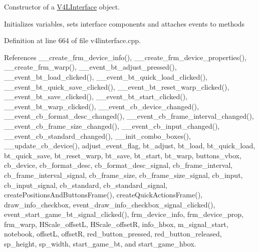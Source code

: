 Constructor of a \hyperlink{class_v_s_s_s___g_u_i_1_1_v4_l_interface}{V4\+L\+Interface} object. 

Initializes variables, sets interface components and attaches events to methods 

Definition at line 664 of file v4linterface.\+cpp.



References \+\_\+\+\_\+create\+\_\+frm\+\_\+device\+\_\+info(), \+\_\+\+\_\+create\+\_\+frm\+\_\+device\+\_\+properties(), \+\_\+\+\_\+create\+\_\+frm\+\_\+warp(), \+\_\+\+\_\+event\+\_\+bt\+\_\+adjust\+\_\+pressed(), \+\_\+\+\_\+event\+\_\+bt\+\_\+load\+\_\+clicked(), \+\_\+\+\_\+event\+\_\+bt\+\_\+quick\+\_\+load\+\_\+clicked(), \+\_\+\+\_\+event\+\_\+bt\+\_\+quick\+\_\+save\+\_\+clicked(), \+\_\+\+\_\+event\+\_\+bt\+\_\+reset\+\_\+warp\+\_\+clicked(), \+\_\+\+\_\+event\+\_\+bt\+\_\+save\+\_\+clicked(), \+\_\+\+\_\+event\+\_\+bt\+\_\+start\+\_\+clicked(), \+\_\+\+\_\+event\+\_\+bt\+\_\+warp\+\_\+clicked(), \+\_\+\+\_\+event\+\_\+cb\+\_\+device\+\_\+changed(), \+\_\+\+\_\+event\+\_\+cb\+\_\+format\+\_\+desc\+\_\+changed(), \+\_\+\+\_\+event\+\_\+cb\+\_\+frame\+\_\+interval\+\_\+changed(), \+\_\+\+\_\+event\+\_\+cb\+\_\+frame\+\_\+size\+\_\+changed(), \+\_\+\+\_\+event\+\_\+cb\+\_\+input\+\_\+changed(), \+\_\+\+\_\+event\+\_\+cb\+\_\+standard\+\_\+changed(), \+\_\+\+\_\+init\+\_\+combo\+\_\+boxes(), \+\_\+\+\_\+update\+\_\+cb\+\_\+device(), adjust\+\_\+event\+\_\+flag, bt\+\_\+adjust, bt\+\_\+load, bt\+\_\+quick\+\_\+load, bt\+\_\+quick\+\_\+save, bt\+\_\+reset\+\_\+warp, bt\+\_\+save, bt\+\_\+start, bt\+\_\+warp, buttons\+\_\+vbox, cb\+\_\+device, cb\+\_\+format\+\_\+desc, cb\+\_\+format\+\_\+desc\+\_\+signal, cb\+\_\+frame\+\_\+interval, cb\+\_\+frame\+\_\+interval\+\_\+signal, cb\+\_\+frame\+\_\+size, cb\+\_\+frame\+\_\+size\+\_\+signal, cb\+\_\+input, cb\+\_\+input\+\_\+signal, cb\+\_\+standard, cb\+\_\+standard\+\_\+signal, create\+Positions\+And\+Buttons\+Frame(), create\+Quick\+Actions\+Frame(), draw\+\_\+info\+\_\+checkbox, event\+\_\+draw\+\_\+info\+\_\+checkbox\+\_\+signal\+\_\+clicked(), event\+\_\+start\+\_\+game\+\_\+bt\+\_\+signal\+\_\+clicked(), frm\+\_\+device\+\_\+info, frm\+\_\+device\+\_\+prop, frm\+\_\+warp, H\+Scale\+\_\+offsetL, H\+Scale\+\_\+offsetR, info\+\_\+hbox, m\+\_\+signal\+\_\+start, notebook, offsetL, offsetR, red\+\_\+button\+\_\+pressed, red\+\_\+button\+\_\+released, sp\+\_\+height, sp\+\_\+width, start\+\_\+game\+\_\+bt, and start\+\_\+game\+\_\+hbox.


